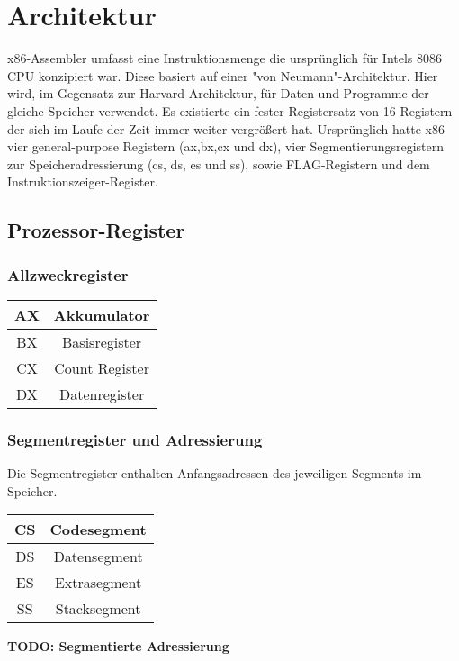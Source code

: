 \section{Architektur}
x86-Assembler umfasst eine Instruktionsmenge die ursprünglich für Intels 8086 CPU konzipiert war. Diese basiert auf einer "von Neumann"-Architektur. Hier wird, im Gegensatz zur Harvard-Architektur, für Daten und Programme der gleiche Speicher verwendet. Es existierte ein fester Registersatz von 16 Registern der sich im Laufe der Zeit immer weiter vergrößert hat. Ursprünglich hatte x86 vier general-purpose Registern (ax,bx,cx und dx), vier Segmentierungsregistern zur Speicheradressierung (cs, ds, es und ss), sowie FLAG-Registern und dem Instruktionszeiger-Register.

\subsection{Prozessor-Register}
\subsubsection{Allzweckregister}
\begin{tabular}{|c|c|}\hline AX & Akkumulator \\\hline BX & Basisregister \\\hline CX & Count Register \\\hline DX & Datenregister \\\hline \end{tabular}

\subsubsection{Segmentregister und Adressierung}

Die Segmentregister enthalten Anfangsadressen des jeweiligen Segments im Speicher.

\begin{tabular}{|c|c|}
\hline CS & Codesegment \\
\hline DS & Datensegment \\
\hline ES & Extrasegment\\
\hline SS & Stacksegment \\
\hline
\end{tabular}

{\bf TODO: Segmentierte Adressierung}

